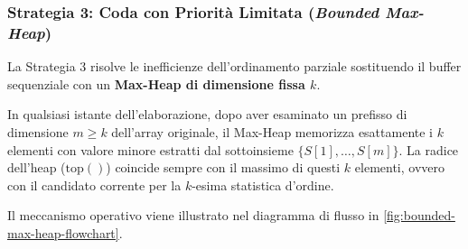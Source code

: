 \subsubsection{Strategia 3: Coda con Priorità Limitata (\textit{Bounded Max-Heap})}
La Strategia 3 risolve le inefficienze dell'ordinamento parziale sostituendo il buffer sequenziale con un \textbf{Max-Heap di dimensione fissa $k$}. 

\begin{property}
In qualsiasi istante dell'elaborazione, dopo aver esaminato un prefisso di dimensione $m \ge k$ dell'array originale, il Max-Heap memorizza esattamente i $k$ elementi con valore minore estratti dal sottoinsieme $\{S[1], \dots, S[m]\}$. La radice dell'heap ($\text{top}()$) coincide sempre con il massimo di questi $k$ elementi, ovvero con il candidato corrente per la $k$-esima statistica d'ordine.
\end{property}

Il meccanismo operativo viene illustrato nel diagramma di flusso in \autoref{fig:bounded-max-heap-flowchart}.

